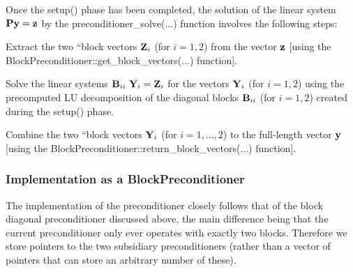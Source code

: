 Once the {\ttfamily setup()} phase has been completed, the solution of the linear system ${\bf P} {\bf y} = {\bf z}$ by the {\ttfamily preconditioner\+\_\+solve}(...) function involves the following steps\+:
\begin{DoxyItemize}
\item Extract the two ``block vectors\textquotesingle{}\textquotesingle{} ${\bf Z}_i$ (for $i=1,2$) from the vector ${\bf z}$ \mbox{[}using the {\ttfamily Block\+Preconditioner\+::get\+\_\+block\+\_\+vectors}(...) function\mbox{]}.
\item Solve the linear systems ${\bf B}_{ii} \ {\bf Y}_i = {\bf Z}_i$ for the vectors ${\bf Y}_i$ (for $i=1,2$) using the precomputed LU decomposition of the diagonal blocks ${\bf B}_{ii}$ (for $i=1,2$) created during the {\ttfamily setup()} phase.
\item Combine the two ``block vectors\textquotesingle{}\textquotesingle{} ${\bf Y}_i$ (for $i=1,...,2$) to the full-\/length vector ${\bf y}$ \mbox{[}using the {\ttfamily Block\+Preconditioner\+::return\+\_\+block\+\_\+vectors}(...) function\mbox{]}.
\end{DoxyItemize}\hypertarget{index_two_plus_three_implementation}{}\subsubsection{Implementation as a Block\+Preconditioner}\label{index_two_plus_three_implementation}
The implementation of the preconditioner closely follows that of the block diagonal preconditioner discussed above, the main difference being that the current preconditioner only ever operates with exactly two blocks. Therefore we store pointers to the two subsidiary preconditioners (rather than a vector of pointers that can store an arbitrary number of these).


